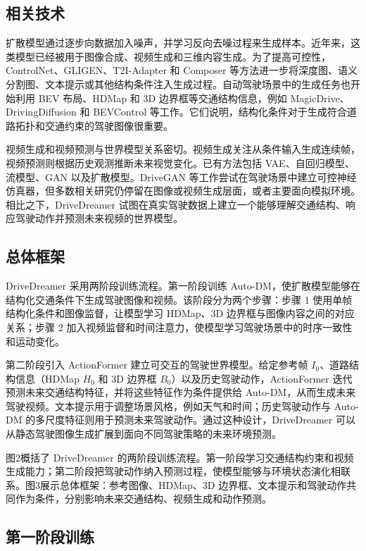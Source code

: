 \documentclass[10pt]{article}
\begin{document}
\subsection{相关技术}
扩散模型通过逐步向数据加入噪声，并学习反向去噪过程来生成样本。近年来，这类模型已经被用于图像合成、视频生成和三维内容生成。为了提高可控性，ControlNet、GLIGEN、T2I-Adapter 和 Composer 等方法进一步将深度图、语义分割图、文本提示或其他结构条件注入生成过程。自动驾驶场景中的生成任务也开始利用 BEV 布局、HDMap 和 3D 边界框等交通结构信息，例如 MagicDrive、DrivingDiffusion 和 BEVControl 等工作。它们说明，结构化条件对于生成符合道路拓扑和交通约束的驾驶图像很重要。

视频生成和视频预测与世界模型关系密切。视频生成关注从条件输入生成连续帧，视频预测则根据历史观测推断未来视觉变化。已有方法包括 VAE、自回归模型、流模型、GAN 以及扩散模型。DriveGAN 等工作尝试在驾驶场景中建立可控神经仿真器，但多数相关研究仍停留在图像或视频生成层面，或者主要面向模拟环境。相比之下，DriveDreamer 试图在真实驾驶数据上建立一个能够理解交通结构、响应驾驶动作并预测未来视频的世界模型。

\subsection{总体框架}
DriveDreamer 采用两阶段训练流程。第一阶段训练 Auto-DM，使扩散模型能够在结构化交通条件下生成驾驶图像和视频。该阶段分为两个步骤：步骤 1 使用单帧结构化条件和图像监督，让模型学习 HDMap、3D 边界框与图像内容之间的对应关系；步骤 2 加入视频监督和时间注意力，使模型学习驾驶场景中的时序一致性和运动变化。

第二阶段引入 ActionFormer 建立可交互的驾驶世界模型。给定参考帧 $I_0$、道路结构信息（HDMap $H_0$ 和 3D 边界框 $B_0$）以及历史驾驶动作，ActionFormer 迭代预测未来交通结构特征，并将这些特征作为条件提供给 Auto-DM，从而生成未来驾驶视频。文本提示用于调整场景风格，例如天气和时间；历史驾驶动作与 Auto-DM 的多尺度特征则用于预测未来驾驶动作。通过这种设计，DriveDreamer 可以从静态驾驶图像生成扩展到面向不同驾驶策略的未来环境预测。

图2概括了 DriveDreamer 的两阶段训练流程。第一阶段学习交通结构约束和视频生成能力；第二阶段把驾驶动作纳入预测过程，使模型能够与环境状态演化相联系。图3展示总体框架：参考图像、HDMap、3D 边界框、文本提示和驾驶动作共同作为条件，分别影响未来交通结构、视频生成和动作预测。

\subsection{第一阶段训练}
\end{document}

